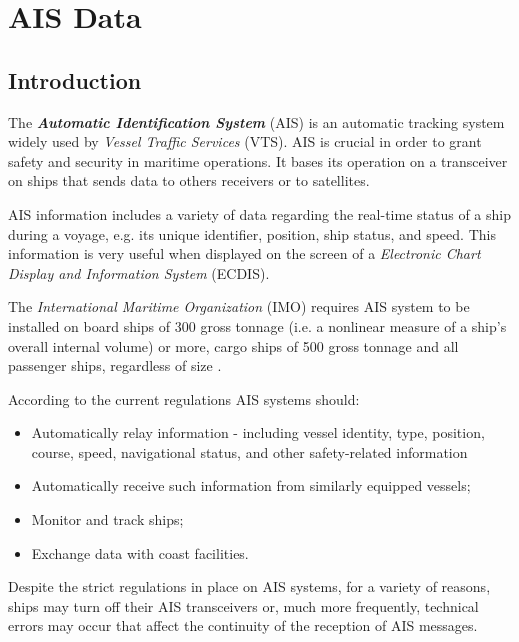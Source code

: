     
\clearpage


\clearpage

\clearpage
\section{AIS Data}
\label{sec:ais}
    \subsection{Introduction}
    The \textit{\textbf{Automatic Identification System}} (AIS) is an automatic tracking system widely used by \textit{Vessel Traffic Services} (VTS). AIS is crucial in order to grant safety and security in maritime operations.
    It bases its operation on a transceiver on ships that sends data to others receivers or to satellites.
    
    AIS information includes a variety of data regarding the real-time status of a ship during a voyage, e.g. its unique identifier, position, ship status, and speed. This information is very useful when displayed on the screen of a \textit{Electronic Chart Display and Information System} (ECDIS).
    
    The \textit{International Maritime Organization} (IMO) requires AIS system to be installed on board ships of 300 gross tonnage (i.e. a nonlinear measure of a ship's overall internal volume) or more, cargo ships of 500 gross tonnage and all passenger ships, regardless of size \cite{ais_regulations}.
    
    According to the current regulations AIS systems should:
    \begin{itemize}
        \item Automatically relay information - including vessel identity, type, position, course, speed, navigational status, and other safety-related information
        \item Automatically receive such information from similarly equipped vessels; 
        \item Monitor and track ships;
        \item Exchange data with coast facilities.
    \end{itemize}

    Despite the strict regulations in place on AIS systems, for a variety of reasons, ships may turn off their AIS transceivers or, much more frequently, technical errors may occur that affect the continuity of the reception of AIS messages.
    
